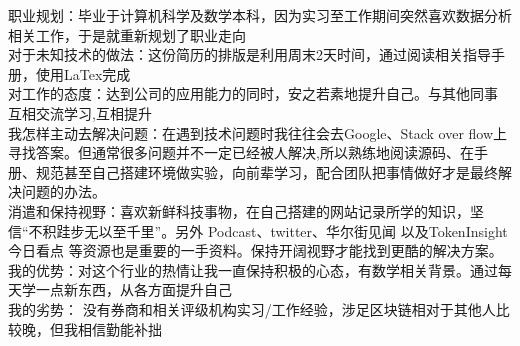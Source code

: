 
\begin{cvparagraph}
\bullet 职业规划：毕业于计算机科学及数学本科，因为实习至工作期间突然喜欢数据分析相关工作，于是就重新规划了职业走向\\
\bullet  对于未知技术的做法：这份简历的排版是利用周末2天时间，通过阅读相关指导手册，使用LaTex完成\\
\bullet  对工作的态度：达到公司的应用能力的同时，安之若素地提升自己。与其他同事 互相交流学习,互相提升\\
\bullet  我怎样主动去解决问题：在遇到技术问题时我往往会去Google、Stack over flow上寻找答案。但通常很多问题并不一定已经被人解决,所以熟练地阅读源码、在手册、规范甚至自己搭建环境做实验，向前辈学习，配合团队把事情做好才是最终解决问题的办法。\\
\bullet  消遣和保持视野：喜欢新鲜科技事物，在自己搭建的网站{\href{http://chenmu1.com/}{\color{deepblue}{Ethan Mu}}记录所学的知识，坚信“不积跬步无以至千里”}。另外 Podcast、twitter、华尔街见闻 以及TokenInsight今日看点 等资源也是重要的一手资料。保持开阔视野才能找到更酷的解决方案。\\
\bullet  我的优势：对这个行业的热情让我一直保持积极的心态，有数学相关背景。通过每天学一点新东西，从各方面提升自己\\
\bullet  我的劣势： 没有券商和相关评级机构实习/工作经验，涉足区块链相对于其他人比较晚，但我相信勤能补拙
\end{cvparagraph}


